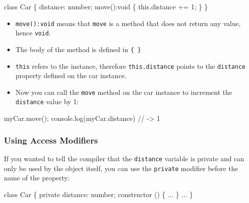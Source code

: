 \documentclass[12pt,]{article}
\newenvironment{Shaded}{}{}
\newcommand{\KeywordTok}[1]{\textcolor[rgb]{0.00,0.00,1.00}{{#1}}}
\newcommand{\DataTypeTok}[1]{{#1}}
\newcommand{\DecValTok}[1]{{#1}}
\newcommand{\CommentTok}[1]{\textcolor[rgb]{0.00,0.50,0.00}{{#1}}}
\newcommand{\FunctionTok}[1]{{#1}}
\newcommand{\NormalTok}[1]{{#1}}
\providecommand{\tightlist}{%
  \setlength{\itemsep}{0pt}\setlength{\parskip}{0pt}}
\begin{document}
\begin{Shaded}
\begin{Highlighting}[numbers=left,,]
\KeywordTok{class} \NormalTok{Car \{}
  \NormalTok{distance: number;}
  \FunctionTok{move}\NormalTok{():}\DataTypeTok{void} \NormalTok{\{}
    \KeywordTok{this}\NormalTok{.}\FunctionTok{distance} \NormalTok{+= }\DecValTok{1}\NormalTok{;}
  \NormalTok{\}}
\NormalTok{\}}
\end{Highlighting}
\end{Shaded}

\begin{itemize}
\tightlist
\item
  \texttt{move():void} means that \texttt{move} is a method that does
  not return any value, hence \texttt{void}.
\item
  The body of the method is defined in \texttt{\{\ \}}
\item
  \texttt{this} refers to the instance, therefore \texttt{this.distance}
  points to the \texttt{distance} property defined on the car instance.
\item
  Now you can call the \texttt{move} method on the car instance to
  increment the \texttt{distance} value by 1:
\end{itemize}

\begin{Shaded}
\begin{Highlighting}[numbers=left,,]
\NormalTok{myCar.}\FunctionTok{move}\NormalTok{();}
\NormalTok{console.}\FunctionTok{log}\NormalTok{(myCar.}\FunctionTok{distance}\NormalTok{) }\CommentTok{// -> 1}
\end{Highlighting}
\end{Shaded}

\subsubsection{Using Access Modifiers}\label{using-access-modifiers}

If you wanted to tell the compiler that the \texttt{distance} variable
is private and can only be used by the object itself, you can use the
\texttt{private} modifier before the name of the property:

\begin{Shaded}
\begin{Highlighting}[numbers=left,,]
\KeywordTok{class} \NormalTok{Car \{}
  \KeywordTok{private} \NormalTok{distance: number;}
  \FunctionTok{constructor} \NormalTok{() \{}
    \NormalTok{...}
  \NormalTok{\}}
  \NormalTok{...}
\NormalTok{\}}
\end{Highlighting}
\end{Shaded}
\end{document}
